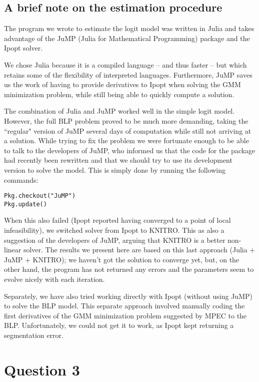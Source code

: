 \documentclass[a4paper,11pt]{article}
\begin{document}
\subsection*{A brief note on the estimation procedure}

The program we wrote to estimate the logit model was written in Julia and takes advantage of the JuMP (Julia for Mathematical Programming) package and the Ipopt solver.

We chose Julia because it is a compiled language -- and thus faster -- but which retains some of the flexibility of interpreted languages. Furthermore, JuMP saves us the work of having to provide derivatives to Ipopt when solving the GMM minimization problem, while still being able to quickly compute a solution.

The combination of Julia and JuMP worked well in the simple logit model. However, the full BLP problem proved to be much more demanding, taking the ``regular" version of JuMP several days of computation while still not arriving at a solution. While trying to fix the problem we were fortunate enough to be able to talk to the developers of JuMP, who informed us that the code for the package had recently been rewritten and that we should try to use its development version to solve the model. This is simply done by running the following commands:
\begin{lstlisting}
Pkg.checkout("JuMP")
Pkg.update()
\end{lstlisting}
When this also failed (Ipopt reported having converged to a point of local infeasibility), we switched solver from Ipopt to KNITRO. This as also a suggestion of the developers of JuMP, arguing that KNITRO is a better non-linear solver. The results we present here are based on this last approach (Julia + JuMP + KNITRO); we haven't got the solution to converge yet, but, on the other hand, the program has not returned any errors and the parameters seem to evolve nicely with each iteration. 

Separately, we have also tried working directly with Ipopt (without using JuMP) to solve the BLP model. This separate approach involved manually coding the first derivatives of the GMM minimization problem suggested by MPEC to the BLP. Unfortunately, we could not get it to work, as Ipopt kept returning a segmentation error.


\section*{Question 3}
\end{document}

